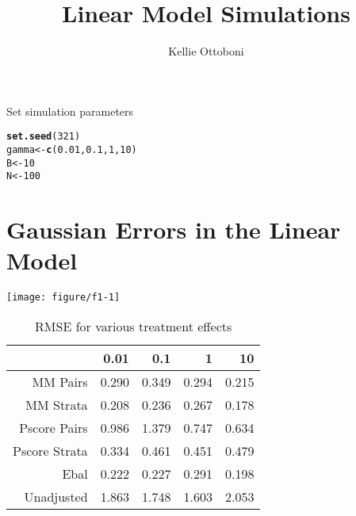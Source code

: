 \documentclass[11pt]{article}\usepackage[]{graphicx}\usepackage[]{color}
\title{Linear Model Simulations}
\author{Kellie Ottoboni}
\makeatletter
\def\maxwidth{ %
  \ifdim\Gin@nat@width>\linewidth
    \linewidth
  \else
    \Gin@nat@width
  \fi
}
\newcommand{\hlnum}[1]{\textcolor[rgb]{0.686,0.059,0.569}{#1}}%
\newcommand{\hlstd}[1]{\textcolor[rgb]{0.345,0.345,0.345}{#1}}%
\newcommand{\hlkwb}[1]{\textcolor[rgb]{0.69,0.353,0.396}{#1}}%
\newcommand{\hlkwd}[1]{\textcolor[rgb]{0.737,0.353,0.396}{\textbf{#1}}}%
\newenvironment{kframe}{%
 \def\at@end@of@kframe{}%
 \ifinner\ifhmode%
  \def\at@end@of@kframe{\end{minipage}}%
  \begin{minipage}{\columnwidth}%
 \fi\fi%
 \def\FrameCommand##1{\hskip\@totalleftmargin \hskip-\fboxsep
 \colorbox{shadecolor}{##1}\hskip-\fboxsep
     \hskip-\linewidth \hskip-\@totalleftmargin \hskip\columnwidth}%
 \MakeFramed {\advance\hsize-\width
   \@totalleftmargin\z@ \linewidth\hsize
   \@setminipage}}%
 {\par\unskip\endMakeFramed%
 \at@end@of@kframe}
\newenvironment{knitrout}{}{} %
\makeatother
\begin{document}
\maketitle


Set simulation parameters
\begin{knitrout}
\color{fgcolor}\begin{kframe}
\begin{alltt}
\hlkwd{set.seed}\hlstd{(}\hlnum{321}\hlstd{)}
\hlstd{gamma} \hlkwb{<-} \hlkwd{c}\hlstd{(}\hlnum{0.01}\hlstd{,} \hlnum{0.1}\hlstd{,} \hlnum{1}\hlstd{,} \hlnum{10}\hlstd{)}
\hlstd{B} \hlkwb{<-} \hlnum{10}
\hlstd{N} \hlkwb{<-} \hlnum{100}
\end{alltt}
\end{kframe}
\end{knitrout}

\section{Gaussian Errors in the Linear Model}
\begin{knitrout}
\color{fgcolor}

{\centering \texttt{[image: figure/f1-1]} 

}



\end{knitrout}
\begin{table}[ht]
\centering
\begin{tabular}{rrrrr}
  \hline
 & 0.01 & 0.1 & 1 & 10 \\ 
  \hline
MM Pairs & 0.290 & 0.349 & 0.294 & 0.215 \\ 
  MM Strata & 0.208 & 0.236 & 0.267 & 0.178 \\ 
  Pscore Pairs & 0.986 & 1.379 & 0.747 & 0.634 \\ 
  Pscore Strata & 0.334 & 0.461 & 0.451 & 0.479 \\ 
  Ebal & 0.222 & 0.227 & 0.291 & 0.198 \\ 
  Unadjusted & 1.863 & 1.748 & 1.603 & 2.053 \\ 
   \hline
\end{tabular}
\caption{RMSE for various treatment effects} 
\label{tab:f1}
\end{table}
\end{document}
